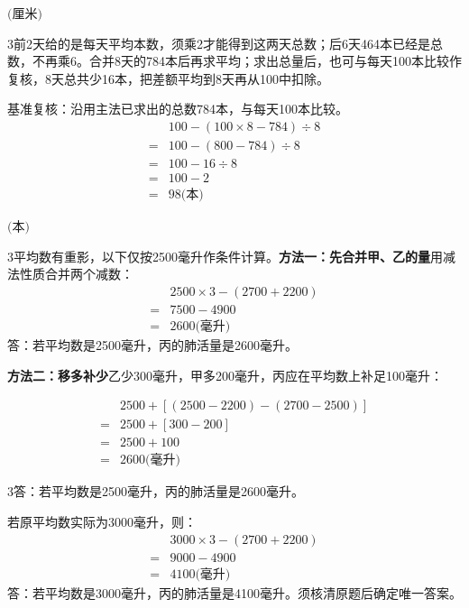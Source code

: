 \documentclass[multi=snippet,border={5bp 20bp 5bp 5bp}]{standalone}
\newenvironment{snippet}[3]{\begin{minipage}{#1bp}\color{answerred}\fontsize{#2}{#3}\selectfont\raggedright}{\end{minipage}}
\begin{document}
\begin{snippet}{80}{9.0}{14}\SourceSans\setlength{\mathindent}{2bp}\(\text{(厘米)}\)\end{snippet}
\begin{snippet}{505}{11.5}{14}\begin{multicols}{3}\raggedcolumns 前2天给的是每天平均本数，须乘2才能得到这两天总数；后6天464本已经是总数，不再乘6。合并8天的784本后再求平均；求出总量后，也可与每天100本比较作复核，8天总共少16本，把差额平均到8天再从100中扣除。\par 基准复核：沿用主法已求出的总数784本，与每天100本比较。\[\begin{aligned}&100-(100\times8-784)\div8\\={}&100-(800-784)\div8\\={}&100-16\div8\\={}&100-2\\={}&98\text{(本)}\end{aligned}\]\end{multicols}\end{snippet}
\begin{snippet}{80}{9.0}{14}\SourceSans\setlength{\mathindent}{2bp}\(\text{(本)}\)\end{snippet}
\begin{snippet}{505}{11.5}{14}\begin{multicols}{3}\raggedcolumns 平均数有重影，以下仅按2500毫升作条件计算。\textbf{方法一：先合并甲、乙的量}用减法性质合并两个减数：\[\begin{aligned}&2500\times3-(2700+2200)\\={}&7500-4900\\={}&2600\text{(毫升)}\end{aligned}\]答：若平均数是2500毫升，丙的肺活量是2600毫升。\par\textbf{方法二：移多补少}乙少300毫升，甲多200毫升，丙应在平均数上补足100毫升：\end{multicols}\[\begin{aligned}&2500+[(2500-2200)-(2700-2500)]\\={}&2500+[300-200]\\={}&2500+100\\={}&2600\text{(毫升)}\end{aligned}\]\begin{multicols}{3}\raggedcolumns 答：若平均数是2500毫升，丙的肺活量是2600毫升。\par 若原平均数实际为3000毫升，则：\[\begin{aligned}&3000\times3-(2700+2200)\\={}&9000-4900\\={}&4100\text{(毫升)}\end{aligned}\]答：若平均数是3000毫升，丙的肺活量是4100毫升。须核清原题后确定唯一答案。\end{multicols}\end{snippet}
\end{document}
